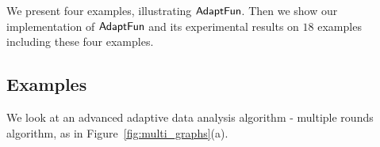 %
We present four examples, illustrating $\textsf{AdaptFun}$.
Then we show our implementation of $\textsf{AdaptFun}$ and its experimental results on $18$ examples including these four examples.
%
\subsection{Examples}
%
\begin{example}
\label{ex:multiplerounds}
%
We look at an advanced adaptive data analysis algorithm - multiple rounds algorithm, as in Figure~\ref{fig:multi_graphs}(a).
%
%
%

\end{example}
